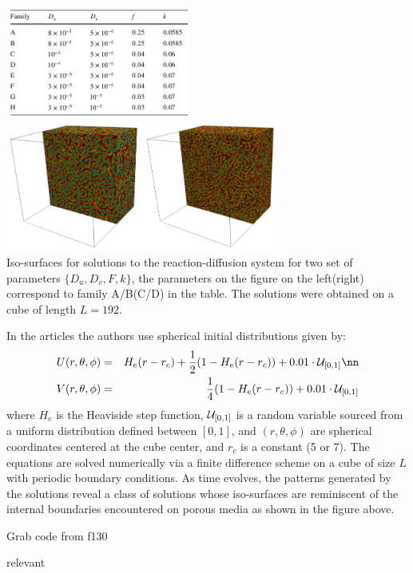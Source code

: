 \begin{center}
\includegraphics[width=6cm]{python_codes/fieldstone_171/images/gama01}
\includegraphics[width=9cm]{python_codes/fieldstone_171/images/gama02}\\
{\captionfont Iso-surfaces for solutions to the reaction-diffusion system 
for two set of parameters $\{D_u,D_v,F,k\}$, the parameters on the figure on 
the left(right) correspond to family A/B(C/D) in the table. The solutions were
obtained on a cube of length $L=192$.}
\end{center}

In the articles the authors use spherical initial distributions given by:
\begin{eqnarray}
U(r,\theta,\phi) &=& H_e(r-r_c) +\frac12 (1-H_e(r-r_c)) + 0.01 \cdot {\cal U}_{[0,1]} \nn\\
V(r,\theta,\phi) &=& \frac14 (1-H_e(r-r_c)) + 0.01 \cdot {\cal U}_{[0,1]}
\end{eqnarray}
where $H_e$ is the Heaviside step function, ${\cal U}_{[0,1]}$ is a random variable sourced from a 
uniform distribution defined between $[0,1]$, and $(r,\theta,\phi)$ are spherical coordinates centered at
the cube center, and $r_c$ is a constant (5 or 7).
The equations are solved numerically via a finite difference scheme on a cube of size $L$
with periodic boundary conditions. As time evolves, the patterns generated by
the solutions reveal a class of solutions whose iso-surfaces are reminiscent of the internal
boundaries encountered on porous media as shown in the figure above.




Grab code from f130

relevant \cite{pear93}

